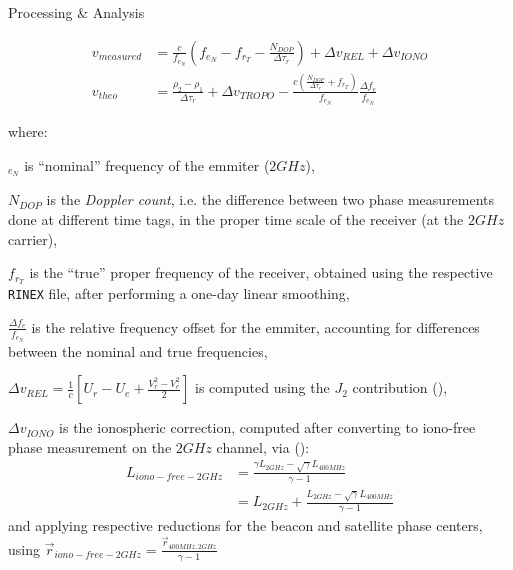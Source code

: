 \documentclass[final,a0,portrait]{beamer}
\newlength{\onecolwid}
\begin{document}
\begin{frame}[t]
\begin{columns}[t]
\begin{column}{\onecolwid}
\begin{block}{Processing \& Analysis}
{\begin{subequations} \label{eq:lem13}
    \begin{align}
        v_{measured} & = \frac{c}{f_{e_N}} (f_{e_N} - f_{r_T} -
          \frac{N_{DOP}}{\Delta\tau_r}) + \Delta v_{REL} + 
          \Delta v_{IONO} \label{eq:lem13a} \\
        v_{theo} &= \frac{\rho_2 - \rho_1}{\Delta\tau_r} +
          \Delta v_{TROPO} - \frac{c(\frac{N_{DOP}}{\Delta\tau_r} + 
          f_{r_T})}{f_{e_N}} \frac{\Delta f_e}{f_{e_N}} \label{eq:lem13b}
    \end{align}
\end{subequations}

where:

\begin{description}
  \item $_{e_N}$ is ``nominal'' frequency of the emmiter ($2GHz$),
%
  \item $N_{DOP}$ is the \emph{Doppler count}, i.e. the diﬀerence between two 
  phase measurements done at diﬀerent time tags, in the proper time scale of 
  the receiver (at the $2GHz$ carrier),
%
  \item $f_{r_T}$ is the ``true'' proper frequency of the receiver, obtained 
  using the respective \texttt{RINEX} file, after performing a one-day linear 
  smoothing,
%
  \item $\frac{\Delta f_e}{f_{e_N}}$ is the relative frequency oﬀset for the 
  emmiter, accounting for differences between the nominal and true frequencies,
%
  \item $\Delta v_{REL} = \frac{1}{c} \left[ U_{r} - U_{e} + \frac{V^2_r - V^2_e}{2} \right]$ is computed using the $J_2$ contribution (\cite{lemoine-2016}),
%
  \item $\Delta v_{IONO}$ is the ionospheric correction, computed after 
  converting to iono-free phase measurement on the $2GHz$ channel, via 
  (\cite{lemoine-2016}):
  \begin{equation}
    \begin{aligned}
      L_{iono-free-2GHz} &= \frac{\gamma L_{2GHz} -
          \sqrt{\gamma}L_{400MHz}}{\gamma - 1} \\
                     &= L_{2GHz} + \frac{L_{2GHz} -
                        \sqrt{\gamma}L_{400MHz}}{\gamma - 1}
    \end{aligned}
  \end{equation}
  and applying respective reductions for the beacon and satellite phase centers, 
  using $\vec{r}_{iono-free-2GHz} = \frac{\vec{r}_{400MHz,2GHz}}{\gamma - 1}$


\end{description}}
\end{block}
\end{column}
\end{columns}
\end{frame}
\end{document}
